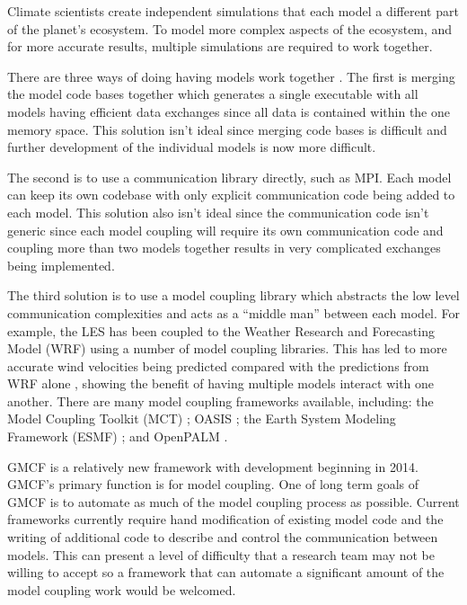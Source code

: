 Climate scientists create independent simulations that each model a different
part of the planet's ecosystem. To model more complex aspects of the ecosystem,
and for more accurate results, multiple simulations are required to work
together.

There are three ways of doing having models work together \cite{Thevenin}. The
first is merging the model code bases together which generates a single
executable with all models having efficient data exchanges since all data is
contained within the one memory space. This solution isn't ideal since merging
code bases is difficult and further development of the individual models is now
more difficult.

The second is to use a communication library directly, such as MPI. Each model
can keep its own codebase with only explicit communication code being added to
each model. This solution also isn't ideal since the communication code isn't
generic since each model coupling will require its own communication code and
coupling more than two models together results in very complicated exchanges
being implemented.

The third solution is to use a model coupling library which abstracts the low
level communication complexities and acts as a ``middle man'' between each
model. For example, the LES has been coupled to the Weather Research and
Forecasting Model (WRF) using a number of model coupling libraries. This has led
to more accurate wind velocities being predicted compared with the predictions
from WRF alone \cite{Kinbara2010,Nakayama1998}, showing the benefit of having
multiple models interact with one another. There are many model coupling
frameworks available, including: the Model Coupling Toolkit (MCT)
\cite{Jacob2005,Larson2005}; OASIS \cite{Valcke2013,Valcke}; the Earth System
Modeling Framework (ESMF) \cite{Ramework2004}; and OpenPALM
\cite{Piacentini2011}.

GMCF is a relatively new framework with development beginning in 2014. GMCF's
primary function is for model coupling. One of long term goals of GMCF is to
automate as much of the model coupling process as possible. Current frameworks
currently require hand modification of existing model code and the writing of
additional code to describe and control the communication between models. This
can present a level of difficulty that a research team may not be willing to
accept so a framework that can automate a significant amount of the model
coupling work would be welcomed.

